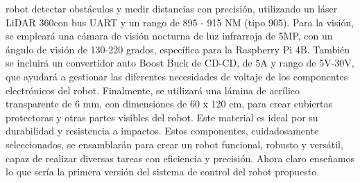         robot detectar obst\'aculos y medir distancias con precisi\'on, utilizando un l\'aser LiDAR 360\degree con bus UART 
        y un rango de 895 - 915 NM (tipo 905).
    \vskip 0.5cm
    Para la visi\'on, se emplear\'a una c\'amara de visi\'on nocturna de luz infrarroja de 5MP, con un \'angulo de visi\'on de 
        130-220 grados, espec\'ifica para la Raspberry Pi 4B. Tambi\'en se incluir\'a un convertidor auto Boost Buck de CD-CD, 
        de 5A y rango de 5V-30V, que ayudar\'a a gestionar las diferentes necesidades de voltaje de los componentes 
        electr\'onicos del robot.
    \vskip 0.5cm
    Finalmente, se utilizar\'a una l\'amina de acr\'ilico transparente de 6 mm, con dimensiones de 60 x 120 cm, 
        para crear cubiertas protectoras y otras partes visibles del robot. Este material es ideal por su 
        durabilidad y resistencia a impactos.
    \vskip 0.5cm
    Estos componentes, cuidadosamente seleccionados, se ensamblar\'an para crear un robot funcional, 
        robusto y vers\'atil, capaz de realizar diversas tareas con eficiencia y precisi\'on.
    \vskip 0.5cm
    Ahora claro ense\~namos lo que ser\'ia la primera versi\'on del sistema de control del robot propuesto.
    
    
    
    
    
    
